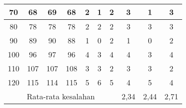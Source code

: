 \documentclass[11pt]{article}
\begin{document}
\begin{table}
\begin{tabular}{|c|c|c|c|c|c|c|c|c|c|}
    70                                 & 68            & 69           & 68           & 2             & 1             & 2            & 3            & 1            & 3           \\ \hline
    80                                 & 78            & 78           & 78           & 2             & 2             & 2            & 3            & 3            & 3           \\ \hline
    90                                 & 89            & 90           & 88           & 1             & 0             & 2            & 1            & 0            & 2           \\ \hline
    100                                & 96            & 97           & 96           & 4             & 3             & 4            & 4            & 3            & 4           \\ \hline
    110                                & 107           & 107          & 108          & 3             & 3             & 2            & 3            & 3            & 2           \\ \hline
    120                                & 115           & 114          & 115          & 5             & 6             & 5            & 4            & 5            & 4           \\ \hline
    \multicolumn{7}{|c|}{Rata-rata kesalahan}                                                                                       & 2,34         & 2,44         & 2,71        \\ \hline
    \end{tabular}
\end{table}
 
\end{document}
